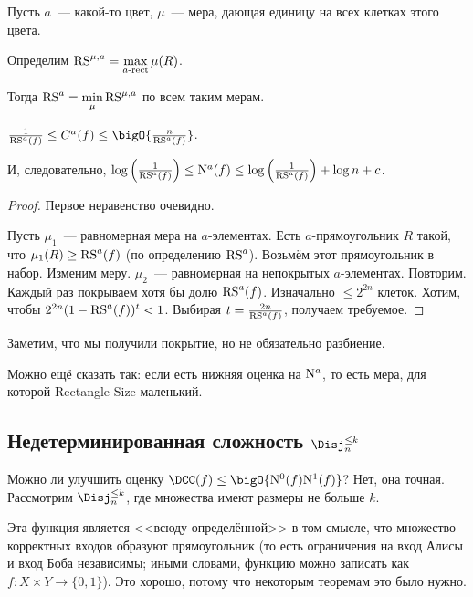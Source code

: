 \begin{definition}
    Пусть $a$~--- какой-то цвет, $\mu$~--- мера, дающая единицу на всех клетках этого цвета.

    Определим $\mathrm{RS}^{\mu, a} = \max\limits_{a\text{-rect}} \mu(R)$.

    Тогда $\mathrm{RS}^a = \min\limits_{\mu} \mathrm{RS}^{\mu, a}$ по всем таким мерам.
\end{definition}

\begin{theorem}
    $\frac{1}{\RS^a(f)} \le C^a(f) \le \bigO{\frac{n}{\RS^a(f)}}$.

    И, следовательно,
    $\log\left(\frac{1}{\mathrm{RS}^a(f)}\right) \le \mathrm{N}^{a}(f) \le \log\left(\frac{1}{\mathrm{RS}^a(f)}\right) + \log n +
    c$.
\end{theorem}

\begin{proof}
    Первое неравенство очевидно.

    Пусть $\mu_1$~--- равномерная мера на $a$-элементах. Есть $a$-прямоугольник $R$ такой, что
    $\mu_1(R) \ge \mathrm{RS}^a(f)$ (по определению $\mathrm{RS}^a$). Возьмём этот прямоугольник в набор. Изменим
    меру. $\mu_2$~--- равномерная на непокрытых $a$-элементах. Повторим. Каждый раз покрываем хотя бы
    долю $\mathrm{RS}^a(f)$. Изначально $\le 2^{2n}$ клеток. Хотим, чтобы $2^{2n} (1 - \mathrm{RS}^a(f))^t < 1$.
    Выбирая $t = \frac{2n}{\mathrm{RS}^a(f)}$, получаем требуемое.
\end{proof}

Заметим, что мы получили покрытие, но не обязательно разбиение.

Можно ещё сказать так: если есть нижняя оценка на $\mathrm{N}^{a}$, то есть мера, для которой Rectangle Size
маленький.

\subsection{Недетерминированная сложность \texorpdfstring{$\Disj^{\le k}_n$}{DISJ(n, <=k)}}

Можно ли улучшить оценку $\DCC(f) \le \bigO{\NCC{0}(f) \NCC{1}(f)}$? Нет, она точная. Рассмотрим
$\Disj^{\le k}_n$, где множества имеют размеры не больше $k$.

Эта функция является <<всюду определённой>> в том смысле, что множество корректных входов образуют
прямоугольник (то есть ограничения на вход Алисы и вход Боба независимы; иными словами, функцию можно
записать как $f\colon X \times Y \to \{0, 1\}$). Это хорошо, потому что некоторым теоремам это было нужно. 

